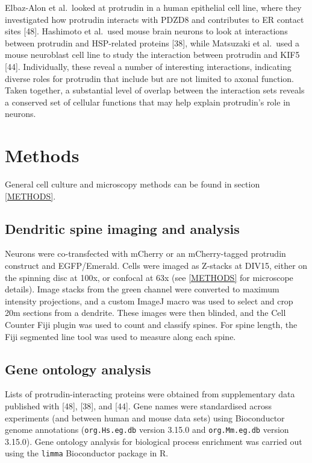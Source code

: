 \documentclass[
  12pt,
  a4paper,
]{book}
\begin{document}
Elbaz-Alon et al.~looked at protrudin in a human epithelial cell line, where they investigated how protrudin interacts with PDZD8 and contributes to ER contact sites {[}48{]}. Hashimoto et al.~used mouse brain neurons to look at interactions between protrudin and HSP-related proteins {[}38{]}, while Matsuzaki et al.~used a mouse neuroblast cell line to study the interaction between protrudin and KIF5 {[}44{]}. Individually, these reveal a number of interesting interactions, indicating diverse roles for protrudin that include but are not limited to axonal function. Taken together, a substantial level of overlap between the interaction sets reveals a conserved set of cellular functions that may help explain protrudin's role in neurons.

\hypertarget{methods-1}{%
\section{Methods}\label{methods-1}}

General cell culture and microscopy methods can be found in section \ref{METHODS}.

\hypertarget{dendritic-spine-imaging-and-analysis}{%
\subsection{Dendritic spine imaging and analysis}\label{dendritic-spine-imaging-and-analysis}}

Neurons were co-transfected with mCherry or an mCherry-tagged protrudin construct and EGFP/Emerald. Cells were imaged as Z-stacks at DIV15, either on the spinning disc at 100x, or confocal at 63x (see \ref{METHODS} for microscope details). Image stacks from the green channel were converted to maximum intensity projections, and a custom ImageJ macro was used to select and crop 20\textmu{}m sections from a dendrite. These images were then blinded, and the Cell Counter Fiji plugin was used to count and classify spines. For spine length, the Fiji segmented line tool was used to measure along each spine.

\hypertarget{gene-ontology-analysis}{%
\subsection{Gene ontology analysis}\label{gene-ontology-analysis}}

Lists of protrudin-interacting proteins were obtained from supplementary data published with {[}48{]}, {[}38{]}, and {[}44{]}. Gene names were standardised across experiments (and between human and mouse data sets) using Bioconductor genome annotations (\texttt{org.Hs.eg.db} version 3.15.0 and \texttt{org.Mm.eg.db} version 3.15.0). Gene ontology analysis for biological process enrichment was carried out using the \texttt{limma} Bioconductor package in R.
\end{document}
